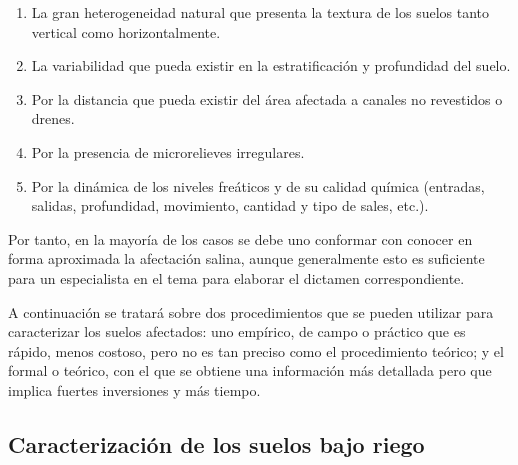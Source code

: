 \begin{enumerate}
    \item La gran heterogeneidad natural que presenta la textura de los suelos tanto vertical como horizontalmente.
    \item La variabilidad que pueda existir en la estratificación y profundidad del suelo.
    \item Por la distancia que pueda existir del área afectada a canales no revestidos o drenes.
    \item Por la presencia de microrelieves irregulares.
    \item Por la dinámica de los niveles freáticos y de su calidad química (entradas, salidas, profundidad, movimiento, cantidad y tipo de sales, etc.).
\end{enumerate}
Por tanto, en la mayoría de los casos se debe uno conformar con conocer en forma aproximada la afectación salina, aunque generalmente esto es suficiente para un especialista en el tema para elaborar el dictamen correspondiente.

A continuación se tratará sobre dos procedimientos que se pueden utilizar para caracterizar los suelos afectados: uno empírico, de campo o práctico que es rápido, menos costoso, pero no es tan preciso como el procedimiento teórico; y el formal o teórico, con el que se obtiene una información más detallada pero que implica fuertes inversiones y más tiempo.

\subsection{Caracterización de los suelos bajo riego}
